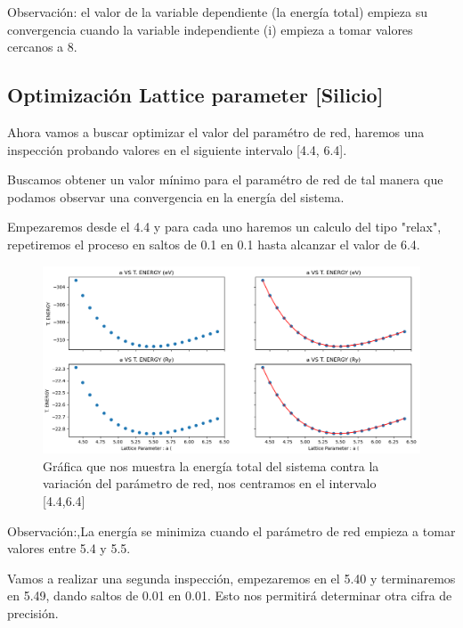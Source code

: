 Observación: el valor de la variable dependiente (la energía total) empieza su convergencia cuando 
la variable independiente (i) empieza a tomar valores cercanos a 8.


\subsection{Optimización Lattice parameter [Silicio] }

Ahora vamos a buscar optimizar el valor del paramétro de red, haremos una inspección probando valores
en el siguiente intervalo [4.4, 6.4].

\vspace{0.5cm}

Buscamos obtener un valor mínimo para el paramétro de red de tal manera que podamos observar una convergencia 
en la energía del sistema.

\vspace{0.5cm}

Empezaremos desde el 4.4 y para cada uno haremos un calculo del tipo "relax", repetiremos el proceso
en saltos de 0.1 en 0.1 hasta alcanzar el valor de 6.4.

\begin{figure}[H]
    \centering
    \includegraphics[scale=0.38]{images/lattice_parameter_vs_T_energy.png}
    \caption{Gráfica que nos muestra la energía total del sistema contra la variación del parámetro de red, nos centramos en el intervalo [4.4,6.4]}
\end{figure}

Observación:,La energía se minimiza cuando el parámetro de red empieza a tomar valores entre 5.4 y 5.5.

\vspace{0.5cm}

Vamos a realizar una segunda inspección, empezaremos en el 5.40 y terminaremos en 5.49, dando saltos
de 0.01 en 0.01. Esto nos permitirá determinar otra cifra de precisión.

